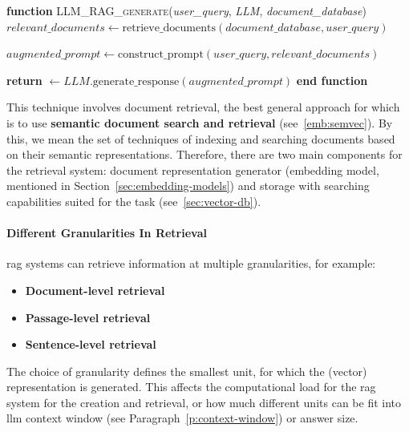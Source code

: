\begin{algorithm}[t]
\caption{Pseudocode for \gls{rag} workflow}
\label{alg:rag}
\begin{algorithmic}[1]
\STATE \textbf{function} \textsc{LLM\_RAG\_generate}(\textit{user\_query}, \textit{LLM}, \textit{document\_database})
    \STATE \quad {}
    \STATE \quad $\textit{relevant\_documents} \gets \text{retrieve\_documents}(\textit{document\_database}, \textit{user\_query})$

    \STATE \quad {}
    \STATE \quad $\textit{augmented\_prompt} \gets \text{construct\_prompt}(\textit{user\_query}, \textit{relevant\_documents})$

    \STATE \quad {}
    \STATE \quad \textbf{return} $\gets \textit{LLM}.\text{generate\_response}(\textit{augmented\_prompt})$
\STATE \textbf{end function}
\end{algorithmic}
\end{algorithm}

This technique involves document retrieval, the best general approach for which
is to use \textbf{semantic document search and retrieval}
(see~\ref{emb:semvec}). By this, we mean the set of techniques of indexing and
searching documents based on their semantic representations. Therefore, there
are two main components for the retrieval system: document representation
generator (embedding model, mentioned in Section~\ref{sec:embedding-models}) and
storage with searching capabilities suited for the task
(see~\ref{sec:vector-db}).

\paragraph{Different Granularities In Retrieval}

\gls{rag} systems can retrieve information at multiple granularities, for
example:

\begin{itemize}
  \item \textbf{Document-level retrieval}
  \item \textbf{Passage-level retrieval}
  \item \textbf{Sentence-level retrieval}
\end{itemize}

The choice of granularity defines the smallest unit, for which the (vector)
representation is generated. This affects the computational load for the
\gls{rag} system for the creation and retrieval, or how much different units can
be fit into \gls{llm} context window (see Paragraph~\ref{p:context-window}) or
answer size.


